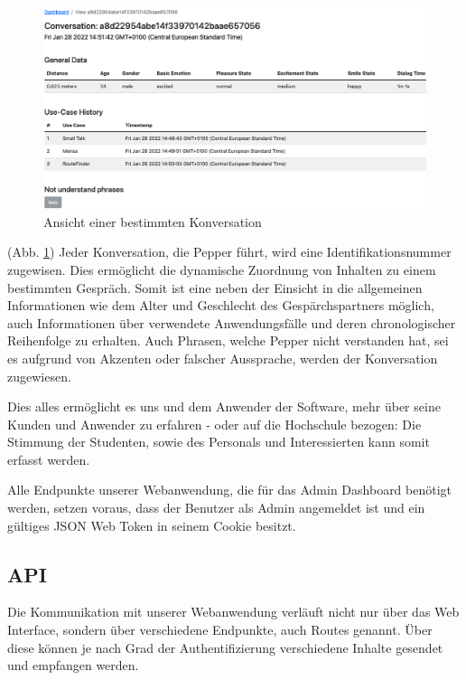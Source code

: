 \begin{figure}[H]
    \includegraphics[width=\textwidth]{Figures/NodeChapter/webappdetail.png}
    \caption{Ansicht einer bestimmten Konversation}
    \label{fig:webappdetail}
    \centering
\end{figure}

(Abb. \ref{fig:webappdetail}) Jeder Konversation, die Pepper führt, wird eine Identifikationsnummer zugewisen. Dies ermöglicht
die dynamische Zuordnung von Inhalten zu einem bestimmten Gespräch. Somit ist eine neben der Einsicht in die allgemeinen Informationen
wie dem Alter und Geschlecht des Gespärchspartners möglich, auch Informationen über verwendete Anwendungsfälle und deren
chronologischer Reihenfolge zu erhalten. Auch Phrasen, welche Pepper nicht verstanden hat, sei es aufgrund von Akzenten oder
falscher Aussprache, werden der Konversation zugewiesen.

Dies alles ermöglicht es uns und dem Anwender der Software, mehr über seine Kunden und Anwender zu erfahren - oder auf die Hochschule
bezogen: Die Stimmung der Studenten, sowie des Personals und Interessierten kann somit erfasst werden.

Alle Endpunkte unserer Webanwendung, die für das Admin Dashboard benötigt werden, setzen voraus, dass der Benutzer als Admin
angemeldet ist und ein gültiges JSON Web Token in seinem Cookie besitzt.


\subsection{API}
\label{sec:nodechapter-api}
Die Kommunikation mit unserer Webanwendung verläuft nicht nur über das Web Interface, sondern über verschiedene Endpunkte,
auch Routes genannt. Über diese können je nach Grad der Authentifizierung verschiedene Inhalte gesendet und empfangen werden.

